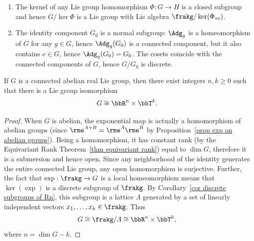 \begin{example}\label{example kernel subgroup}
    \begin{enumerate}
        \item The kernel of any Lie group homomorphism $\Phi:G\to H$ is a closed subgroup and hence $G\slash \ker\Phi$ is a Lie group with Lie algebra $\frakg\slash\ker(\Phi_{\ast e})$.
        \item The identity component $G_0$ is a normal subgroup: $\Adg_g$ is a homeomorphism of $G$ for any $g\in G$, hence $\Adg_g(G_0)$ is a connected component, but it also contains $e\in G$, hence $\Adg_g(G_0)=G_0$. The cosets coincide with the connected components of $G$, hence $G\slash G_0$ is discrete.
    \end{enumerate}
\end{example}



\begin{cor}
    If $G$ is a connected abelian real Lie group, then there exist integers $n,k\geq 0$ such that there is a Lie group isomorphism
    \[G\cong \bbR^n\times \bbT^k.\]
\end{cor}
\begin{proof}
    When $G$ is abelian, the exponential map is actually a homomorphism of abelian groups (since $\rme^{A+B}=\rme^A\rme^B$ by Proposition~\ref{prop exp on abelian groups}). Being a homomorphism, it has constant rank (by the Equivariant Rank Theorem~\ref{thm equivariant rank}) equal to $\dim G$, therefore it is a submersion and hence open. Since any neighborhood of the identity generates the entire connected Lie group, any open homomorphism is surjective. Further, the fact that $\exp:\frakg\to G$ is a local homeomorphism means that $\ker(\exp)$ is a discrete subgroup of $\frakg$. By Corollary~\ref{cor discrete subgroups of Rn}, this subgroup is a lattice $\varLambda$ generated by a set of linearly independent vectors $x_1,\ldots,x_k\in\frakg$. Thus
    \[G\cong \frakg\slash \varLambda\cong \bbR^n\times \bbT^k,\]
    where $n=\dim G-k$.
\end{proof}


